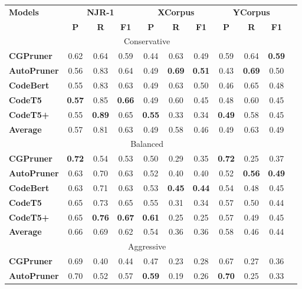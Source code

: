 \begin{tabular}{lcccccccccc}
\toprule
\multirow{2}{*}{\textbf{Models}} & \multicolumn{3}{c}{\textbf{NJR-1}} & \multicolumn{3}{c}{\textbf{XCorpus}} & \multicolumn{3}{c}{\textbf{YCorpus}} \\
\cmidrule(lr){2-4} \cmidrule(lr){5-7} \cmidrule(lr){8-10}
& \textbf{P} & \textbf{R} & \textbf{F1} & \textbf{P} & \textbf{R} & \textbf{F1} & \textbf{P} & \textbf{R} & \textbf{F1} \\
\midrule
\multicolumn{10}{c}{Conservative} \\
\midrule
\textbf{CGPruner} & 0.62 & 0.64 & 0.59 & 0.44 & 0.63 & 0.49 & 0.59 & 0.64 & \textbf{0.59} \\
\textbf{AutoPruner} & 0.56 & 0.83 & 0.64 & 0.49 & \textbf{0.69} & \textbf{0.51} & 0.43 & \textbf{0.69} & 0.50  \\
\textbf{CodeBert} & 0.55 & 0.83 & 0.63 & 0.49 & 0.63 & 0.50 & 0.46 & 0.65 & 0.48 \\
\textbf{CodeT5} & \textbf{0.57} & 0.85 & \textbf{0.66} & 0.49 & 0.60 & 0.45 & 0.48 & 0.60 & 0.45 \\
\textbf{CodeT5+} & 0.55 & \textbf{0.89} & 0.65 & \textbf{0.55} & 0.33 & 0.34 & \textbf{0.49} & 0.58 & 0.45 \\
\midrule
\textbf{Average} & 0.57 & 0.81 & 0.63 & 0.49 & 0.58 & 0.46 & 0.49 & 0.63 & 0.49 \\
\midrule
\multicolumn{10}{c}{Balanced} \\
\midrule
\textbf{CGPruner} & \textbf{0.72} & 0.54 & 0.53 & 0.50 & 0.29 & 0.35 & \textbf{0.72} & 0.25 & 0.37 \\
\textbf{AutoPruner} & 0.63 & 0.70 & 0.63 & 0.52 & 0.40 & 0.40 & 0.52 & \textbf{0.56} & \textbf{0.49}   \\
\textbf{CodeBert} & 0.63 & 0.71 & 0.63 & 0.53 & \textbf{0.45} & \textbf{0.44} & 0.54 & 0.48 & 0.45 \\
\textbf{CodeT5} & 0.65 & 0.73 & 0.65 & 0.55 & 0.31 & 0.34 & 0.57 & 0.50 & 0.44 \\
\textbf{CodeT5+} & 0.65 & \textbf{0.76} & \textbf{0.67} & \textbf{0.61} & 0.25 & 0.25 & 0.57 & 0.49 & 0.45 \\
\midrule
\textbf{Average} & 0.66 & 0.69 & 0.62 & 0.54 & 0.36 & 0.36 & 0.58 & 0.46 & 0.44 \\
\midrule
\multicolumn{10}{c}{Aggressive} \\
\midrule
\textbf{CGPruner} & 0.69 & 0.40 & 0.44 & 0.47 & 0.23 & 0.28 & 0.67 & 0.27 & 0.36 \\
\textbf{AutoPruner} & 0.70 & 0.52 & 0.57 & \textbf{0.59} & 0.19 & 0.26 & \textbf{0.70} & 0.25 & 0.33  \\

\end{tabular}
